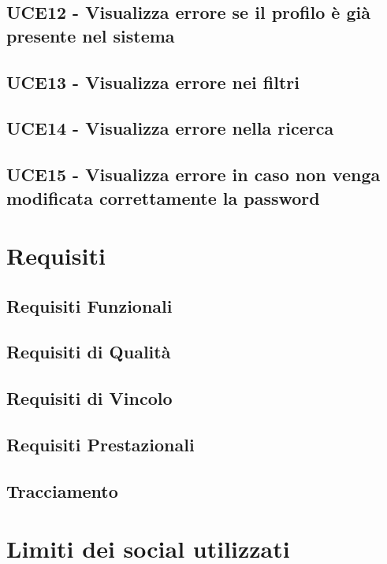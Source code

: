 \documentclass[a4paper]{article}
\begin{document}
	\subsection{UCE12 - Visualizza errore se il profilo è già presente nel sistema}
	
	
	\subsection{UCE13 - Visualizza errore nei filtri}
	
	
	\subsection{UCE14 - Visualizza errore nella ricerca}
	
	
	\subsection{UCE15 - Visualizza errore in caso non venga modificata correttamente la password}
	
	
	\section{Requisiti}
	
	
	\subsection{Requisiti Funzionali}
	
	
	\subsection{Requisiti di Qualità}
	
	
	\subsection{Requisiti di Vincolo}
	
	
	\subsection{Requisiti Prestazionali}
		
	
	\subsection{Tracciamento}
		
	\newpage

	\section{Limiti dei social utilizzati}
	
	
\end{document}
